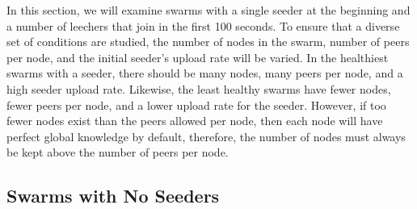 In this section, we will examine swarms with a single seeder at the beginning
and a number of leechers that join in the first 100 seconds. To ensure
that a diverse set of conditions are studied, the number of nodes in the swarm, 
number of peers per node, and the initial seeder's upload rate will be varied.
In the healthiest swarms with a seeder, there should be many nodes, many peers per node, and
a high seeder upload rate. Likewise, the least healthy swarms have fewer nodes,
fewer peers per node, and a lower upload rate for the seeder. However, if too fewer
nodes exist than the peers allowed per node, then each node will have perfect global
knowledge by default, therefore, the number of nodes must always be kept above
the number of peers per node. 









\subsection{Swarms with No Seeders}

